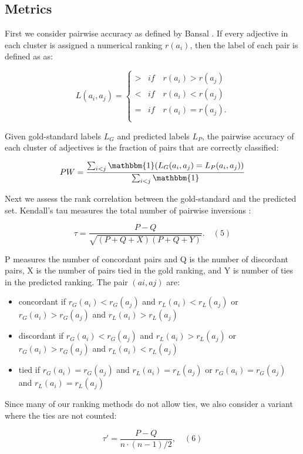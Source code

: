 \subsection{Metrics}

First we consider pairwise accuracy as defined by Bansal . If every adjective in each cluster is assigned a numerical ranking $r(a_i)$, then the label of each pair is defined as as: 

\[
  L(a_i, a_j) = \begin{cases}
  > & if \quad r(a_i) > r(a_j)\\
  < & if \quad r(a_i) < r(a_j)\\
  = & if \quad r(a_i) = r(a_j).\\
  \end{cases}
\]

Given gold-standard labels $L_G$ and predicted labels $L_P$, the pairwise accuracy of each cluster of adjectives is the fraction of pairs that are correctly classified:

\[
PW = \frac{ \sum_{i < j} \mathbbm{1}( L_G(a_i,a_j) = L_P(a_i,a_j) )  }{\sum_{i<j} \mathbbm{1} }
\]

Next we assess the rank correlation between the gold-standard and the predicted set. Kendall's tau measures the total number of pairwise inversions :

\[
\tau = \frac{ P - Q }{\sqrt{  (P + Q + X)(P + Q + Y) }  }. \quad (5)
\]


P measures the number of concordant pairs and Q is the number of discordant pairs, X is the number of pairs tied in the gold ranking, and Y is number of ties in the predicted ranking. The pair $(ai,aj)$ are:

\begin{itemize}
\item concordant if $r_G(a_i) < r_G(a_j)$ and $r_L(a_i) < r_L(a_j)$ or $r_G(a_i)> r_G(a_j)$ and $r_L(a_i) > r_L(a_j)$
\item discordant if $r_G(a_i) < r_G(a_j)$ and $r_L(a_i) > r_L(a_j)$ or $r_G(a_i) > r_G(a_j)$ and $r_L(a_i) < r_L(a_j)$
\item tied if $r_G(a_i) = r_G(a_j)$ and $r_L(a_i) = r_L(a_j)$ or $r_G(a_i) = r_G(a_j)$ and $r_L(a_i) = r_L(a_j)$
\end{itemize}

Since many of our ranking methods do not allow ties, we also consider a variant where the ties are not counted:

\[
  \tau' = \frac{ P - Q }{n \cdot (n-1)/ 2 }, \quad (6)
\]

